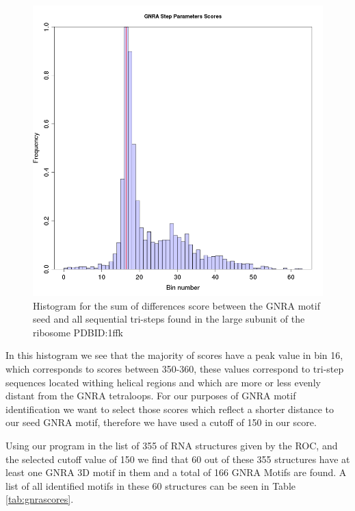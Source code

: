 \begin{figure}
\centering 
\includegraphics[angle=0, scale=0.5]{Chapter5/gnrahisto.png}
\caption{Histogram for  the sum of differences score  between the GNRA
  motif seed and  all sequential tri-steps found in  the large subunit
  of the ribosome PDBID:1ffk}
\label{fig:gnrahist}
\end{figure}

In this histogram we see that the majority of scores have a peak value
in bin 16,  which corresponds to scores between  350-360, these values
correspond to  tri-step sequences located withing  helical regions and
which are  more or less evenly  distant from the  GNRA tetraloops. For
our  purposes of  GNRA motif  identification we  want to  select those
scores  which reflect  a  shorter  distance to  our  seed GNRA  motif,
therefore we have used a cutoff of 150 in our score.

Using our  program in the list of  355 of RNA structures  given by the
ROC, and the selected cutoff value of 150 we find that 60 out of these
355 structures have at least one GNRA  3D motif in them and a total of
166 GNRA Motifs are found. A list of all identified motifs in these 60
structures can be seen in Table \ref{tab:gnrascores}.


